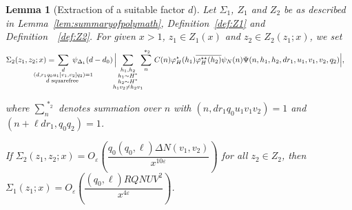 \documentclass{amsart}
\newtheorem{lemma}{Lemma}
\numberwithin{equation}{section}
\begin{document}
\begin{lemma}[Extraction of a suitable factor $d$]\label{lem:preparationII}
Let $\Sigma_1$, $Z_1$ and $Z_2$   be as described in Lemma~{\rm \ref{lem:summaryofpolymath}}, Definition~{\rm \ref{def:Z1}} and Definition~~{\rm \ref{def:Z2}}.
For given $x>1$, $z_1 \in Z_1(x)$ and $z_2\in Z_2(z_1;x)$,  we set 
\begin{align*}
&\Sigma_2(z_1,z_2;x)=\!\!\!\!\!\!\!\!\!\!\!\!\!\!\!\!\!\! \sum_{\substack{d  \\ (d,r_1q_0u_1[v_1,v_2]q_2)=1 \\ d \mbox{\begin{scriptsize}
squarefree
\end{scriptsize}}
}} \!\!\!\!\!\!\!\!\!\!\!\!\!\!\!\!\!\psi_{\Delta_1}(d-d_0)\, \Big|\!\!\!\! \sum_{\substack{h_1, h_2 \\ h_1 \sim H^* \\ h_2 \sim H^*  \\ h_1 v_2 \neq h_2v_1 }}  \!\!\!\sum_{\substack{n }}^{\,\,*_2} \,C(n)\varphi_H^\star(h_1) \overline{\varphi_H^{\star\star}(h_2)}\psi_N(n)  \Psi(n,h_1,h_2,dr_1,u_1,v_1,v_2,q_2) \Big|,
\end{align*}

\vspace{-3mm}
where $\sum\limits^{\,\,*_2}_n$ denotes summation over $n$ with $(n,dr_1q_0u_1v_1v_2  )=1$ and $(n+\ell dr_1, q_0q_2)=1$.

\vspace{1mm}
If $\Sigma_2(z_1,z_2;x) = O_{\varepsilon}\!\left(\dfrac{q_0(q_0,\ell)\Delta N (v_1,v_2)}{x^{10\varepsilon}}\right)$ for all $z_2 \in Z_2$, then $\Sigma_1(z_1;x) = O_{\varepsilon}\!\left(\dfrac{(q_0,\ell)RQNUV^2}{x^{4\varepsilon}}\right)$. 
\end{lemma}
\end{document}
